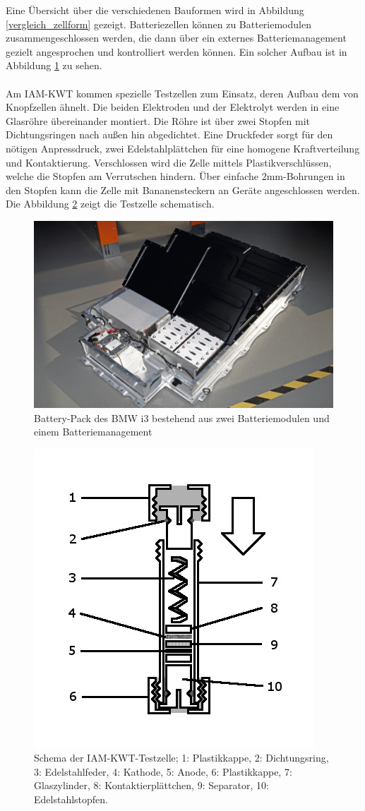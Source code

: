 \documentclass[a4paper, 11pt, headsepline,footsepline,twoside,abstract]{scrbook}
\begin{document}
Eine Übersicht über die verschiedenen Bauformen wird in Abbildung \ref{vergleich_zellform} gezeigt. Batteriezellen können zu Batteriemodulen zusammengeschlossen werden, die dann über ein externes Batteriemanagement gezielt angesprochen und kontrolliert werden können. Ein solcher Aufbau ist in Abbildung \ref{battery_pack} zu sehen.
\\\\
Am IAM-KWT kommen spezielle Testzellen zum Einsatz, deren Aufbau dem von Knopfzellen ähnelt. Die beiden Elektroden und der Elektrolyt werden in eine Glasröhre übereinander montiert. Die Röhre ist über zwei Stopfen mit Dichtungsringen nach außen hin abgedichtet. Eine Druckfeder sorgt für den nötigen Anpressdruck, zwei Edelstahlplättchen für eine homogene Kraftverteilung und Kontaktierung. Verschlossen wird die Zelle mittels Plastikverschlüssen, welche die Stopfen am Verrutschen hindern. Über einfache 2mm-Bohrungen in den Stopfen kann die Zelle mit Bananensteckern an Geräte angeschlossen werden. Die Abbildung \ref{schema_zelle} zeigt die Testzelle schematisch.
\begin{figure}
	\centering
	\includegraphics[width=0.9\columnwidth]{images/bmw-i3-battery-pack.png}
	\caption{Battery-Pack des BMW i3 bestehend aus zwei Batteriemodulen und einem Batteriemanagement}
	\label{battery_pack}
\end{figure}
\begin{figure}
	\centering
	\includegraphics[width=0.55\columnwidth]{images/Schema_Zelle.jpg}
	\caption{Schema der IAM-KWT-Testzelle; 
			1: Plastikkappe,
			2: Dichtungsring,
			3: Edelstahlfeder,
			4: Kathode,
			5: Anode,
			6: Plastikkappe,
			7: Glaszylinder,
			8: Kontaktierplättchen,
			9: Separator,
			10: Edelstahlstopfen.
			}
	\label{schema_zelle}
\end{figure}
\end{document}
